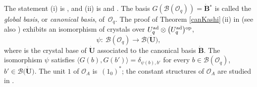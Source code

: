 \documentclass[pdftex]{sigma}
\numberwithin{equation}{section}
\theoremstyle{definition}
\newcommand{\Ll}{{\mathcal L}}
\newcommand{\Oo}{{\mathcal O}}
\newcommand{\ra}{\rightarrow}
\begin{document}
The statement (i) is \cite[Theorem~1]{Kashiwara2}, and (ii) is \cite[Theorem 10.1 and Proposition 10.2.2]{Kashiwara3} and \cite[Section~29.5]{Lusztig}. The basis $G(\mathcal{B}(\Oo_q))=\dot{\mathbf{B}} {}^*$ is called the {\it global basis}, or {\it canonical basis}, of~$\Oo_q$. The proof of Theorem \ref{canKashi}\,(ii) in \cite{Kashiwara3} (see also \cite{Kashiwara4}) exhibits an isomorphism of crystals over $U_q^{\rm ad} \otimes \big(U_q^{\rm ad}\big){}^{\rm op}$,
\begin{equation}\label{isocrystal}
\psi\colon\ \mathcal{B}(\Oo_q) \ra \mathcal{B}\bigl(\dot{\mathbf{U}}\bigr),
\end{equation}
where \smash{$\big(\Ll\bigl(\dot{\mathbf{U}}\bigr),\mathcal{B}\bigl(\dot{\mathbf{U}}\bigr)\big)$} is the crystal base of $\dot{\mathbf{U}}$ associated to the canonical basis $\dot{\mathbf{B}}$. The isomorphism $\psi$ satisfies $\langle G(b),G(b')\rangle =\delta_{\psi(b),b'}$ for every $b\in \mathcal{B}(\Oo_q)$, $b'\in \mathcal{B}\bigl(\dot{\mathbf{U}}\bigr)$. The unit $1$ of $\Oo_A$ is~$(1_0)^*$; the constant structures of $\Oo_A$ are studied in \cite{Lusztig,Lusztig3}.
\end{document}
